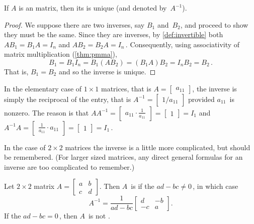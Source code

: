\begin{theorem} \label{thm:uninv} 
If \(A\) is an  matrix, then its  is unique (and denoted by~\(A^{-1}\)).
\end{theorem}
\begin{proof} 
We suppose there are two inverses, say \(B_1\) and~\(B_2\), and proceed to show they must be the same.
Since they are inverses, by \autoref{def:invertible} both
\(AB_1=B_1A=I_n\) and \(AB_2=B_2A=I_n\)\,.
Consequently, using associativity of matrix multiplication (\autoref{thm:pmma}),
\begin{equation*}
B_1=B_1I_n=B_1(AB_2)=(B_1A)B_2=I_nB_2=B_2\,.
\end{equation*}
That is, \(B_1=B_2\) and so the inverse is unique.
\end{proof}



In the elementary case of \(1\times1\) matrices, that is \(A=\begin{bmatrix} a_{11} \end{bmatrix}\), the inverse is simply the reciprocal of the entry, that is \(A^{-1}=\begin{bmatrix} 1/a_{11} \end{bmatrix}\) provided \(a_{11}\)~is nonzero.
The reason is that \(AA^{-1}=\begin{bmatrix} a_{11}\cdot\frac1{a_{11}} \end{bmatrix}=\begin{bmatrix} 1 \end{bmatrix}=I_1\) and  \(A^{-1}A=\begin{bmatrix} \frac1{a_{11}}\cdot a_{11} \end{bmatrix}=\begin{bmatrix} 1 \end{bmatrix}=I_1\)\,.

In the case of \(2\times2\) matrices the inverse is a little more complicated, but should be remembered.
(For larger sized matrices, any direct general formulas for an inverse are too complicated to remember.)

\begin{theorem} \label{thm:2x2det} 
Let \(2\times2\) matrix \(A=\begin{bmatrix} a&b\\c&d \end{bmatrix}\). Then \(A\)~is  if the  \(ad-bc\neq0\)\,, in which case
\begin{equation}
A^{-1}=\frac1{ad-bc}\begin{bmatrix} d&-b\\-c&a \end{bmatrix}.
\label{eq:2x2inv}
\end{equation}
If the  \(ad-bc=0\)\,, then \(A\)~is not .
\end{theorem}

